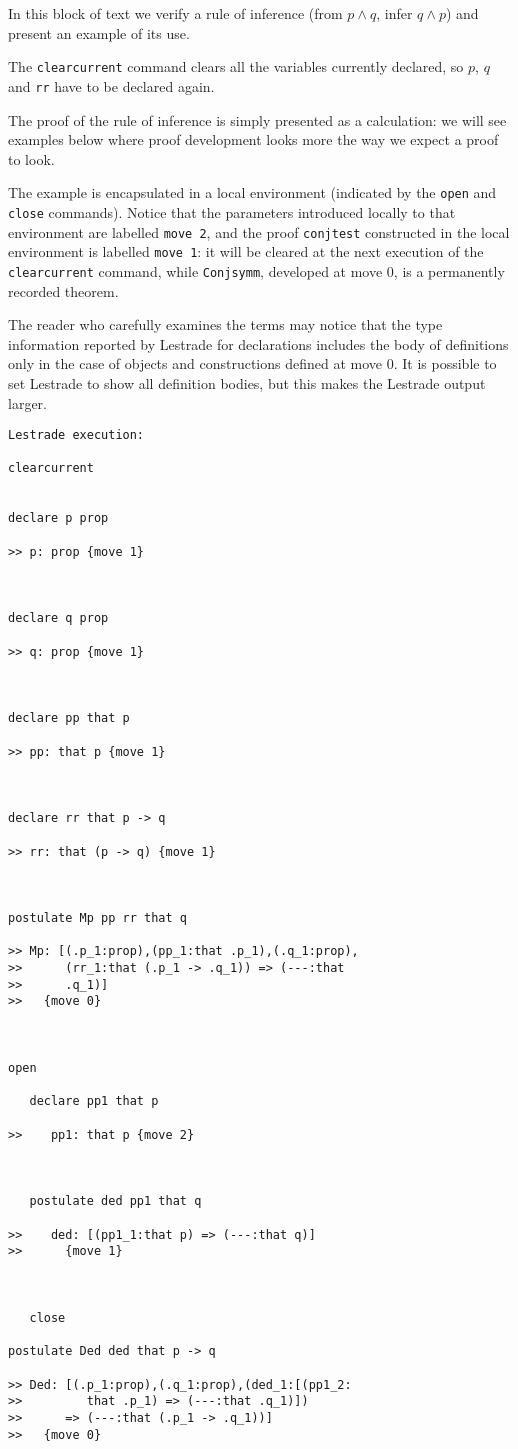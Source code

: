\documentclass[12pt]{article}
\begin{document}
In this block of text we verify a rule of inference (from $p \wedge q$, infer $q \wedge p$) and present an example of its use.

The {\tt clearcurrent} command clears all the variables currently declared, so $p$, $q$ and {\tt rr} have to be declared again.

The proof of the rule of inference is simply presented as a calculation:  we will see examples below where proof development looks more the way we expect a proof to look.

The example is encapsulated in a local environment (indicated by the {\tt open} and {\tt close} commands).  Notice that the parameters introduced locally to that environment
are labelled {\tt move 2}, and the proof {\tt conjtest} constructed in the local environment is labelled {\tt move 1}:  it will be cleared at the next execution of the {\tt clearcurrent}
command, while {\tt Conjsymm}, developed at move 0, is a permanently recorded theorem.

The reader who carefully examines the terms may notice that the type information reported by Lestrade for declarations includes the body of definitions only in the case of
objects and constructions defined at move 0.  It is possible to set Lestrade to show all definition bodies, but this makes the Lestrade output larger.

\begin{verbatim}Lestrade execution:

clearcurrent


declare p prop

>> p: prop {move 1}



declare q prop

>> q: prop {move 1}



declare pp that p

>> pp: that p {move 1}



declare rr that p -> q

>> rr: that (p -> q) {move 1}



postulate Mp pp rr that q

>> Mp: [(.p_1:prop),(pp_1:that .p_1),(.q_1:prop),
>>      (rr_1:that (.p_1 -> .q_1)) => (---:that
>>      .q_1)]
>>   {move 0}



open

   declare pp1 that p

>>    pp1: that p {move 2}



   postulate ded pp1 that q

>>    ded: [(pp1_1:that p) => (---:that q)]
>>      {move 1}



   close

postulate Ded ded that p -> q

>> Ded: [(.p_1:prop),(.q_1:prop),(ded_1:[(pp1_2:
>>         that .p_1) => (---:that .q_1)])
>>      => (---:that (.p_1 -> .q_1))]
>>   {move 0}


\end{verbatim}
\end{document}
